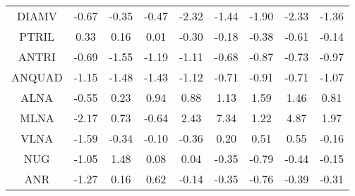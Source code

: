 \documentclass[11pt,a4paper]{report}
\begin{document}
\begin{longtable}{ | c || c | c | c | c | c | c | c || c |}
DIAMV &  \cellcolor[HTML]{FFEFEF} -0.67 &  \cellcolor[HTML]{FFF7F7} -0.35 &  \cellcolor[HTML]{FFF7F7} -0.47 &  \cellcolor[HTML]{FFC7C7} -2.32 &  \cellcolor[HTML]{FFD7D7} -1.44 &  \cellcolor[HTML]{FFCFCF} -1.90 &  \cellcolor[HTML]{FFC7C7} -2.33 &  \cellcolor[HTML]{FFDFDF} -1.36 \\
PTRIL &  \cellcolor[HTML]{F7F7FF} 0.33 &  \cellcolor[HTML]{F7F7FF} 0.16 &  \cellcolor[HTML]{FFFFFF} 0.01 &  \cellcolor[HTML]{FFF7F7} -0.30 &  \cellcolor[HTML]{FFF7F7} -0.18 &  \cellcolor[HTML]{FFF7F7} -0.38 &  \cellcolor[HTML]{FFEFEF} -0.61 &  \cellcolor[HTML]{FFFFFF} -0.14 \\
ANTRI &  \cellcolor[HTML]{FFEFEF} -0.69 &  \cellcolor[HTML]{FFD7D7} -1.55 &  \cellcolor[HTML]{FFDFDF} -1.19 &  \cellcolor[HTML]{FFE7E7} -1.11 &  \cellcolor[HTML]{FFEFEF} -0.68 &  \cellcolor[HTML]{FFE7E7} -0.87 &  \cellcolor[HTML]{FFEFEF} -0.73 &  \cellcolor[HTML]{FFE7E7} -0.97 \\
ANQUAD &  \cellcolor[HTML]{FFDFDF} -1.15 &  \cellcolor[HTML]{FFD7D7} -1.48 &  \cellcolor[HTML]{FFD7D7} -1.43 &  \cellcolor[HTML]{FFDFDF} -1.12 &  \cellcolor[HTML]{FFEFEF} -0.71 &  \cellcolor[HTML]{FFE7E7} -0.91 &  \cellcolor[HTML]{FFEFEF} -0.71 &  \cellcolor[HTML]{FFE7E7} -1.07 \\
ALNA &  \cellcolor[HTML]{FFEFEF} -0.55 &  \cellcolor[HTML]{F7F7FF} 0.23 &  \cellcolor[HTML]{E7E7FF} 0.94 &  \cellcolor[HTML]{E7E7FF} 0.88 &  \cellcolor[HTML]{DFDFFF} 1.13 &  \cellcolor[HTML]{D7D7FF} 1.59 &  \cellcolor[HTML]{D7D7FF} 1.46 &  \cellcolor[HTML]{E7E7FF} 0.81 \\
MLNA &  \cellcolor[HTML]{FFC7C7} -2.17 &  \cellcolor[HTML]{EFEFFF} 0.73 &  \cellcolor[HTML]{FFEFEF} -0.64 &  \cellcolor[HTML]{BFBFFF} 2.43 &  \cellcolor[HTML]{4848FF} 7.34 &  \cellcolor[HTML]{DFDFFF} 1.22 &  \cellcolor[HTML]{8787FF} 4.87 &  \cellcolor[HTML]{CFCFFF} 1.97 \\
VLNA &  \cellcolor[HTML]{FFD7D7} -1.59 &  \cellcolor[HTML]{FFF7F7} -0.34 &  \cellcolor[HTML]{FFFFFF} -0.10 &  \cellcolor[HTML]{FFF7F7} -0.36 &  \cellcolor[HTML]{F7F7FF} 0.20 &  \cellcolor[HTML]{EFEFFF} 0.51 &  \cellcolor[HTML]{EFEFFF} 0.55 &  \cellcolor[HTML]{FFF7F7} -0.16 \\
NUG &  \cellcolor[HTML]{FFE7E7} -1.05 &  \cellcolor[HTML]{D7D7FF} 1.48 &  \cellcolor[HTML]{FFFFFF} 0.08 &  \cellcolor[HTML]{FFFFFF} 0.04 &  \cellcolor[HTML]{FFF7F7} -0.35 &  \cellcolor[HTML]{FFEFEF} -0.79 &  \cellcolor[HTML]{FFF7F7} -0.44 &  \cellcolor[HTML]{FFFFFF} -0.15 \\
ANR &  \cellcolor[HTML]{FFDFDF} -1.27 &  \cellcolor[HTML]{FFFFFF} 0.16 &  \cellcolor[HTML]{EFEFFF} 0.62 &  \cellcolor[HTML]{FFFFFF} -0.14 &  \cellcolor[HTML]{FFF7F7} -0.35 &  \cellcolor[HTML]{FFEFEF} -0.76 &  \cellcolor[HTML]{FFF7F7} -0.39 &  \cellcolor[HTML]{FFF7F7} -0.31 \\

\end{longtable}
\end{document}
